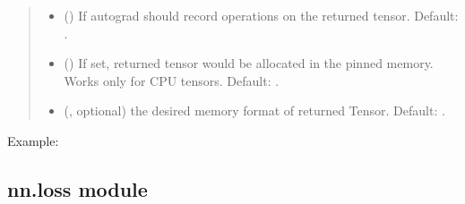 \documentclass[letterpaper,10pt,english]{sphinxmanual}
\begin{document}
\begin{fulllineitems}
\begin{quote}
\begin{description}
\begin{itemize}
\item {} 
 (\sphinxstyleliteralemphasis{\sphinxupquote{, }}) \textendash{} If autograd should record operations on the
returned tensor. Default: .

\item {} 
 (\sphinxstyleliteralemphasis{\sphinxupquote{, }}) \textendash{} If set, returned tensor would be allocated in
the pinned memory. Works only for CPU tensors. Default: .

\item {} 
 (, optional) \textendash{} the desired memory format of
returned Tensor. Default: .

\end{itemize}

\end{description}\end{quote}

Example:

\begin{sphinxVerbatim}[commandchars=\\\{\}]
 
\PYG{g+go}{       [[ 6.3984,  0.0000,  0.0000],}
\PYG{g+go}{        [ 0.0000,  0.0000,  0.0000]])}
\end{sphinxVerbatim}

\end{fulllineitems}



\subsection{nn.loss module}
\label{\detokenize{nn:module-nn.loss}}\label{\detokenize{nn:nn-loss-module}}
\end{document}
